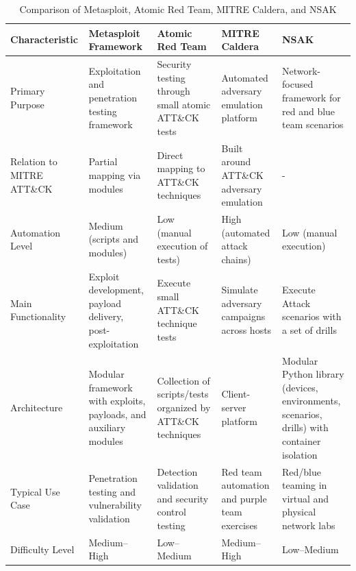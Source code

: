 \renewcommand{\arraystretch}{1.3}
\begin{table}[H]
    \centering
    \small
    \begin{tabularx}{\textwidth}
        {
     |
     >{\raggedright\arraybackslash}X|
     >{\raggedright\arraybackslash}X|
     >{\raggedright\arraybackslash}X|
     >{\raggedright\arraybackslash}X|
     >{\raggedright\arraybackslash}X|
        }
    \hline

    \textbf{Characteristic} &
    \textbf{Metasploit Framework} &
    \textbf{Atomic Red Team} &
    \textbf{MITRE Caldera} &
    \textbf{NSAK} \\
    \hline

    Primary Purpose &
    Exploitation and penetration testing framework &
    Security testing through small atomic ATT\&CK tests &
    Automated adversary emulation platform &
    Network-focused framework for red and blue team scenarios \\
    \hline

    Relation to MITRE ATT\&CK &
    Partial mapping via modules &
    Direct mapping to ATT\&CK techniques &
    Built around ATT\&CK adversary emulation &
    - \\
    \hline

    Automation Level &
    Medium (scripts and modules) &
    Low (manual execution of tests) &
    High (automated attack chains) &
    Low (manual execution)\\
    \hline

    Main Functionality &
    Exploit development, payload delivery, post-exploitation &
    Execute small ATT\&CK technique tests &
    Simulate adversary campaigns across hosts &
    Execute Attack scenarios with a set of drills\\
    \hline

    Architecture &
    Modular framework with exploits, payloads, and auxiliary modules &
    Collection of scripts/tests organized by ATT\&CK techniques &
    Client-server platform &
    Modular Python library (devices, environments, scenarios, drills) with container isolation \\
    \hline

    Typical Use Case &
    Penetration testing and vulnerability validation &
    Detection validation and security control testing &
    Red team automation and purple team exercises &
    Red/blue teaming in virtual and physical network labs \\
    \hline

    Difficulty Level &
    Medium--High &
    Low--Medium &
    Medium--High &
    Low--Medium \\
    \hline

    \end{tabularx}
    \caption{Comparison of Metasploit, Atomic Red Team, MITRE Caldera, and NSAK}
    \label{tab:framework-comparison}
\end{table}
\renewcommand{\arraystretch}{1}

